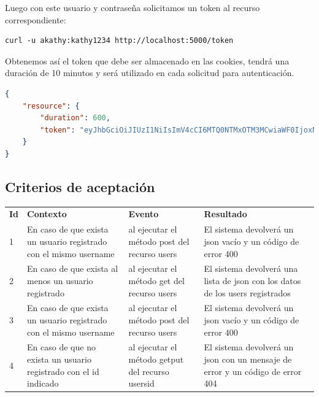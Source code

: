 \documentclass[a4paper,12pt]{article}
\begin{document}
\begin{enumerate}
    Luego con este usuario y contraseña solicitamos un token al recurso correspondiente:

\begin{verbatim}
curl -u akathy:kathy1234 http://localhost:5000/token
\end{verbatim}
   
   Obtenemos así el token que debe ser almacenado en las cookies, tendrá una duración de 10 minutos y será utilizado en cada solicitud para autenticación.
   
\begin{lstlisting}[language=json]
{
    "resource": {
        "duration": 600, 
        "token": "eyJhbGciOiJIUzI1NiIsImV4cCI6MTQ0NTMxOTM3MCwiaWF0IjoxNDQ1MzE4NzcwfQ.eyJpZCI6Mn0.2eZRjbMq9tg4GykJx8EU-Ux4ZoyUW6WnBlADsvnpQvE"
    }
}
\end{lstlisting}

\end{enumerate}

\subsection{Criterios de aceptación}

\begin{center}
\begin{longtable}{|p{0.5cm}|p{4cm}|p{4cm}|p{5cm}|}
\hline \hline \rowcolor[gray]{0.9}
	\multicolumn{4}{||c|}{\textbf{Criterio de aceptación}} \\
    \hline  \rowcolor[gray]{0.9}
        \textbf{Id} &
        \textbf{Contexto} &
        \textbf{Evento}&
        \textbf{Resultado} \\
    \hline
1&En caso de que exista un usuario registrado con el mismo username & al ejecutar el método post del recurso \/users  & El sistema devolverá un json vacío y un código de error 400 \\ \hline
	\hline
2&En caso de que exista al menos un usuario registrado & al ejecutar el método get del recurso \/users  & El sistema devolverá una lista de json con los datos de los users registrados \\ 		\hline
	\hline
3&En caso de que exista un usuario registrado con el mismo username & al ejecutar el método post del recurso \/users  & El sistema devolverá un json vacío y un código de error 400 \\ \hline
    \hline
4&En caso de que no exista un usuario registrado con el id indicado & al ejecutar el método get\/put del recurso \/users\/id  & El sistema devolverá un json con un mensaje de error y un código de error 404 \\ \hline

  \end{longtable}
\end{center}
\end{document}
